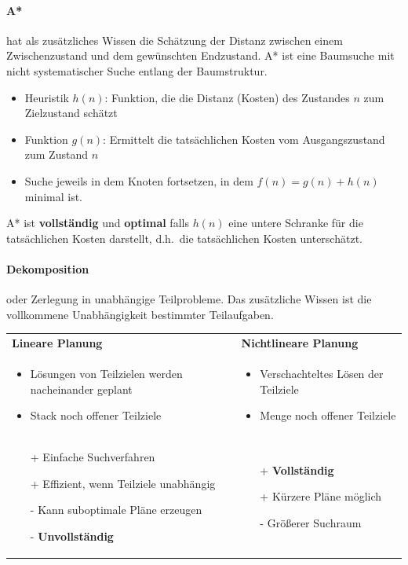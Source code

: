 \paragraph*{A*}
hat als zusätzliches Wissen die Schätzung der \glq Distanz\grq{} zwischen einem Zwischenzustand und dem gewünschten Endzustand.
A* ist eine Baumsuche mit nicht systematischer Suche entlang der Baumstruktur.
\begin{itemize}
	\item Heuristik $h(n)$: Funktion, die die Distanz (Kosten) des Zustandes $n$ zum Zielzustand schätzt
	\item Funktion $g(n)$: Ermittelt die tatsächlichen Kosten vom Ausgangszustand zum Zustand $n$
	\item Suche jeweils in dem Knoten fortsetzen, in dem $f(n) = g(n) + h(n)$ minimal ist.
\end{itemize}
A* ist \textbf{vollständig} und \textbf{optimal} falls $h(n)$ eine untere Schranke für die tatsächlichen Kosten darstellt, d.h.\ die tatsächlichen Kosten unterschätzt.

\paragraph*{Dekomposition} oder Zerlegung in unabhängige Teilprobleme.
Das zusätzliche Wissen ist die vollkommene Unabhängigkeit bestimmter Teilaufgaben.
\vspace{1em} \\
\begin{tabular}{p{} p{}}
\textbf{Lineare Planung} & \textbf{Nichtlineare Planung} \\
\begin{itemize}
	\item Lösungen von Teilzielen werden nacheinander geplant
	\item Stack noch offener Teilziele
\end{itemize}
&
\begin{itemize}
	\item Verschachteltes Lösen der Teilziele
	\item Menge noch offener Teilziele
\end{itemize}
\\
\begin{itemize}
	\item[+] Einfache Suchverfahren
	\item[+] Effizient, wenn Teilziele unabhängig
	\item[-] Kann suboptimale Pläne erzeugen
	\item[-] \textbf{Unvollständig}
\end{itemize}
&
\begin{itemize}
	\item[+] \textbf{Vollständig}
	\item[+] Kürzere Pläne möglich
	\item[-] Größerer Suchraum
\end{itemize}
\end{tabular}

